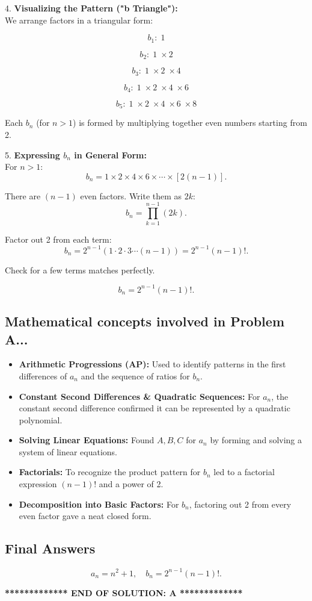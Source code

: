 \documentclass[12pt,a4paper]{article}
\begin{document}
\bigskip

4. \textbf{Visualizing the Pattern ("b Triangle"):} \\
\bigskip
We arrange factors in a triangular form:

\[
b_1: \; 1
\]

\[
b_2: \; 1 \;\times 2
\]

\[
b_3: \; 1 \;\times 2 \;\times 4
\]

\[
b_4: \; 1 \;\times 2 \;\times 4 \;\times 6
\]

\[
b_5: \; 1 \;\times 2 \;\times 4 \;\times 6 \;\times 8
\]

Each $b_n$ (for $n>1$) is formed by multiplying together even numbers starting from 2.

\bigskip

5. \textbf{Expressing $b_n$ in General Form:} \\
For $n>1$:
\[
b_n = 1\times 2\times 4\times 6 \times \cdots \times [2(n-1)].
\]

There are $(n-1)$ even factors. Write them as $2k$:
\[
b_n = \prod_{k=1}^{n-1}(2k).
\]

Factor out 2 from each term:
\[
b_n = 2^{n-1}(1\cdot 2 \cdot 3 \cdots (n-1)) = 2^{n-1}(n-1)!.
\]

Check for a few terms matches perfectly.

\[
\boxed{b_n = 2^{n-1}(n-1)!}.
\]

\subsection*{Mathematical concepts involved in Problem A...}

\begin{itemize}
\item \textbf{Arithmetic Progressions (AP):} Used to identify patterns in the first differences of $a_n$ and the sequence of ratios for $b_n$.
\item \textbf{Constant Second Differences \& Quadratic Sequences:} For $a_n$, the constant second difference confirmed it can be represented by a quadratic polynomial.
\item \textbf{Solving Linear Equations:} Found $A,B,C$ for $a_n$ by forming and solving a system of linear equations.
\item \textbf{Factorials:} To recognize the product pattern for $b_n$ led to a factorial expression $(n-1)!$ and a power of 2.
\item \textbf{Decomposition into Basic Factors:} For $b_n$, factoring out 2 from every even factor gave a neat closed form.
\end{itemize}

\subsection*{Final Answers}

\[
\boxed{a_n = n^2 + 1,\quad b_n = 2^{n-1}(n-1)!.}
\]

\bigskip
\noindent\hrulefill
\begin{center}
\textbf{************* END OF SOLUTION: A *************}
\end{center}
\hrulefill
\end{document}
